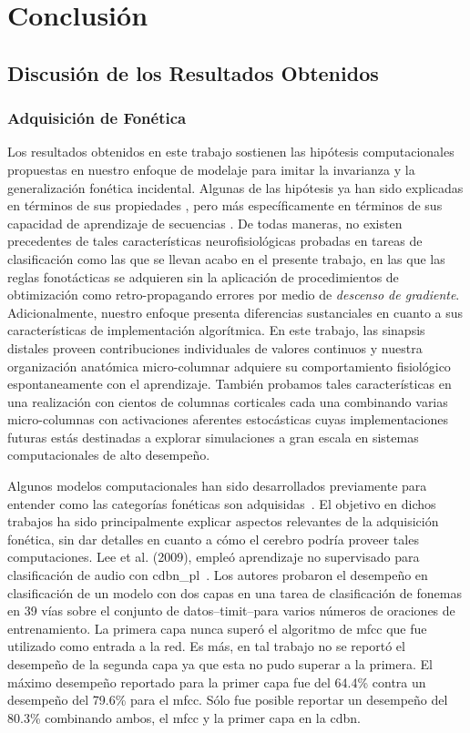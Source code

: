 \chapter{Conclusión}

\label{ch:conclusions}

\section{Discusión de los Resultados Obtenidos}

\subsection{Adquisición de Fonética}

Los resultados obtenidos en este trabajo sostienen las hipótesis computacionales propuestas en nuestro enfoque de modelaje para imitar la invarianza y la generalización fonética incidental.
Algunas de las hipótesis ya han sido explicadas en términos de sus propiedades  \cite{hawkins_2016}, pero más específicamente en términos de sus capacidad de aprendizaje de secuencias \cite{cui_2016}.
De todas maneras, no existen precedentes de tales características neurofisiológicas probadas en tareas de clasificación como las que se llevan acabo en el presente trabajo, en las que las reglas fonotácticas se adquieren sin la aplicación de procedimientos de obtimización como retro-propagando errores por medio de \emph{descenso de gradiente}. Adicionalmente, nuestro enfoque presenta diferencias sustanciales en cuanto a sus características de implementación algorítmica. En este trabajo, las sinapsis distales proveen contribuciones individuales de valores continuos y nuestra organización anatómica micro-columnar adquiere su comportamiento fisiológico espontaneamente con el aprendizaje. También probamos tales características en una realización con cientos de columnas corticales cada una combinando varias micro-columnas con activaciones aferentes estocásticas cuyas implementaciones futuras estás destinadas a explorar simulaciones a gran escala en sistemas computacionales de alto desempeño.

Algunos modelos computacionales han sido desarrollados previamente para entender como las categorías fonéticas son adquisidas~\cite{rasanen_2012}. El objetivo en dichos trabajos ha sido principalmente explicar aspectos relevantes de la adquisición fonética, sin dar detalles en cuanto a cómo el cerebro podría proveer tales computaciones.
Lee et al. (2009), empleó aprendizaje no supervisado para clasificación de audio con \gls{cdbn_pl}~\cite{Lee:2009:UFL:2984093.2984217}. 
Los autores probaron el desempeño en clasificación de un modelo con dos capas en una tarea de clasificación de fonemas en 39 vías sobre el conjunto de datos--\gls{timit}--para varios números de oraciones de entrenamiento. 
La primera capa nunca superó el algoritmo de \gls{mfcc} que fue utilizado como entrada a la red.
Es más, en tal trabajo no se reportó el desempeño de la segunda capa ya que esta no pudo superar a la primera.
El máximo desempeño reportado para la primer capa fue del 64.4\% contra un desempeño del 79.6\% para el \gls{mfcc}.
Sólo fue posible reportar un desempeño del 80.3\% combinando ambos, el \gls{mfcc} y la primer capa en la \gls{cdbn}.

